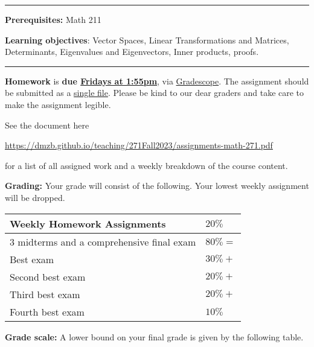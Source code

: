 \documentclass[12pt]{article}
\begin{document}
\smallskip \hrule \medskip

\noindent\textbf{Prerequisites:} Math 211
\medskip

\noindent \textbf{Learning objectives}: Vector Spaces, Linear Transformations and Matrices, Determinants, Eigenvalues and Eigenvectors, Inner products, proofs.

\medskip \hrule \medskip

\noindent \textbf{Homework} is \textbf{due \underline{Fridays at 1:55pm}}, via \underline{Gradescope}. The assignment should be submitted as a \underline{single file}. Please be kind to our dear graders and take care to make the assignment legible.
\smallskip

\noindent See the document here
\begin{center}
 \url{https://dmzb.github.io/teaching/271Fall2023/assignments-math-271.pdf}
\end{center}
for a list of all assigned work and a weekly breakdown of the course content.
\medskip

\noindent\textbf{Grading:}
Your grade will consist of the following. Your lowest weekly assignment will be dropped.

\begin{center}
 \begin{tabular}{|l|l|}
 \hline
 Weekly Homework Assignments & $20\%$ \\
 \hline
 3 midterms and a comprehensive final exam & $80\% = $ 	 \\
 Best exam & $30\% + $ 	 \\
 Second best exam& $20\% + $ 	 \\
 Third best exam & $20\% + $ 	 \\
 Fourth best exam & $10\%$ 	 \\
 \hline
 \end{tabular}
\end{center}

\vspace*{.15in}
\noindent\textbf{Grade scale:}
A lower bound on your final grade is given by the following table.
\end{document}
